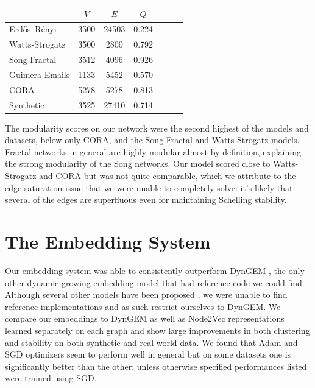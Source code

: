 \documentclass[12pt,twoside]{report}
\begin{document}
\begin{center}
\begin{tabular}{l*{5}{c}r}
              & $V$ & $E$ & $Q$ \\
\hline
Erdős–Rényi & 3500 & 24503 & 0.224 \\
Watts-Strogatz & 3500 & 2800 & 0.792 \\
Song Fractal & 3512 & 4096 & 0.926 \\
Guimera Emails & 1133 & 5452 & 0.570 \\
CORA & 5278 & 5278 & 0.813 \\
Synthetic & 3525 & 27410 & 0.714 \\
\end{tabular}
\end{center} 

The modularity scores on our network were the second highest of the models and datasets, below only CORA, and the Song Fractal and Watts-Strogatz models. Fractal networks in general are highly modular almost by definition, explaining the strong modularity of the Song networks. Our model scored close to Watts-Strogatz and CORA but was not quite comparable, which we attribute to the edge saturation issue that we were unable to completely solve: it's likely that several of the edges are superfluous even for maintaining Schelling stability. \\

\section{The Embedding System}

Our embedding system was able to consistently outperform DynGEM \cite{goyal2018dyngem}, the only other dynamic growing embedding model that had reference code we could find. Although several other models have been proposed \cite{ma2018dynamic, trivedi2018representation}, we were unable to find reference implementations and as such restrict ourselves to DynGEM. We compare our embeddings to DynGEM as well as Node2Vec \cite{grover2016node2vec} representations learned separately on each graph and show large improvements in both clustering and stability on both synthetic and real-world data. We found that Adam and SGD optimizers seem to perform well in general but on some datasets one is significantly better than the other: unless otherwise specified performances listed were trained using SGD. \\
\end{document}
